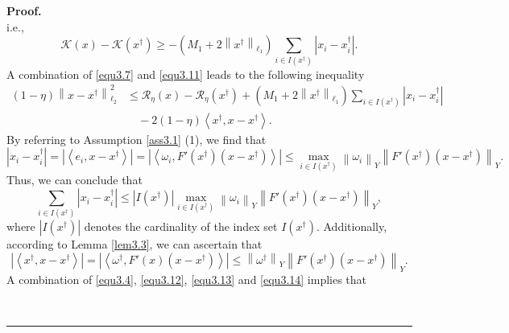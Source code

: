 \documentclass[a4paper,12pt]{article}
\numberwithin{equation}{section}
\newenvironment{proof}[1][Proof]{\textbf{#1.} }
{\ \rule{0.75em}{0.75em}\smallskip}
\begin{document}
\begin{proof}
\begin{equation*}
    \end{equation*}
    i.e.,
    \begin{equation}\label{equ3.11}
        \mathcal{K}\left(x\right)-\mathcal{K}\left(x^{\dagger}\right) \geq -\left(M_{1}+2\left\|x^{\dagger}\right\|_{\ell_{1}}\right) \sum_{i\in I\left(x^{\dagger}\right)}\left|x_{i}-x_{i}^{\dagger}\right|.
    \end{equation}
    A combination of \eqref{equ3.7} and \eqref{equ3.11} leads to the following inequality
    \begin{align}\label{equ3.12}
        \left(1-\eta\right)\left\|x-x^{\dagger}\right\|_{\ell_{2}}^{2}
        & \leq \mathcal{R}_{\eta}\left(x\right)-\mathcal{R}_{\eta}\left(x^{\dagger}\right) + \left(M_{1}+2\left\|x^{\dagger}\right\|_{\ell_{1}}\right) \sum_{i\in I\left(x^{\dagger}\right)}\left|x_{i}-x_{i}^{\dagger}\right| \nonumber\\
        & \quad -2\left(1-\eta\right)\left<x^{\dagger}, x-x^{\dagger}\right>.
    \end{align}
    By referring to Assumption \ref{ass3.1} (1), we find that
    \begin{equation*}
        \left|x_{i}-x^{\dagger}_{i}\right|=\left|\left<e_{i}, x-x^{\dagger}\right> \right| =\left|\left<\omega_{i}, F'\left(x^{\dagger}\right) \left(x-x^{\dagger}\right)\right>\right|\leq \max_{i\in I\left(x^{\dagger}\right)}\left\|\omega_{i}\right\|_{Y} \left\|F'\left(x^{\dagger}\right)\left(x-x^{\dagger}\right)\right\|_{Y}.
    \end{equation*}
    Thus, we can conclude that
    \begin{equation}\label{equ3.13}
        \sum_{i\in I\left(x^{\dagger}\right)}\left|x_{i}-x_{i}^{\dagger}\right| \leq \left|I\left(x^{\dagger}\right)\right|\max_{i\in I\left(x^{\dagger}\right)} \left\|\omega_{i}\right\|_{Y} \left\|F'\left(x^{\dagger}\right)\left(x-x^{\dagger}\right)\right\|_{Y},
    \end{equation} 
    where $\left|I\left(x^{\dagger}\right)\right|$ denotes the cardinality of the index set $I\left(x^{\dagger}\right)$. Additionally, according to Lemma \ref{lem3.3}, we can ascertain that
    \begin{equation}\label{equ3.14}
        \left|\left<x^{\dagger}, x-x^{\dagger}\right>\right| = \left|\left<\omega^{\dagger}, F'\left(x\right)\left(x-x^{\dagger}\right) \right>\right| \leq \left\|\omega^{\dagger}\right\|_{Y} \left\|F'\left(x^{\dagger}\right)\left(x-x^{\dagger}\right)\right\|_{Y}.
    \end{equation}
    A combination of \eqref{equ3.4}, \eqref{equ3.12}, \eqref{equ3.13} and \eqref{equ3.14} implies that

\end{proof}
\end{document}
